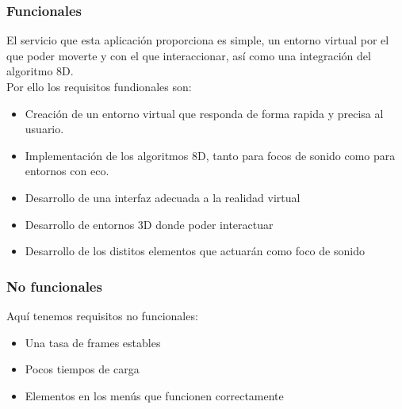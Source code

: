 \subsubsection{Funcionales}

\quad El servicio que esta aplicación proporciona es simple, un entorno virtual por el que poder moverte y con el que interaccionar, así como una integración del algoritmo 8D.\\

\quad Por ello los requisitos fundionales son:
\begin{itemize}
	\item Creación de un entorno virtual que responda de forma rapida y precisa al usuario.
	\item Implementación de los algoritmos 8D, tanto para focos de sonido como para entornos con eco.
	\item Desarrollo de una interfaz adecuada a la realidad virtual
	\item Desarrollo de entornos 3D donde poder interactuar
	\item Desarrollo de los distitos elementos que actuarán como foco de sonido 
\end{itemize}


\subsubsection{No funcionales}

\quad Aquí tenemos requisitos no funcionales:
\begin{itemize}
	\item Una tasa de frames estables
	\item Pocos tiempos de carga 
	\item Elementos en los menús que funcionen correctamente
\end{itemize}

\newpage
